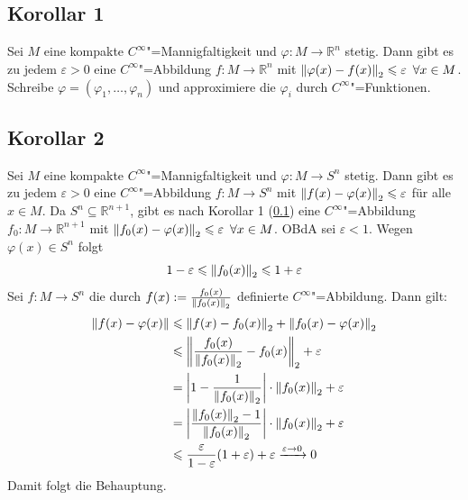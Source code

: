 \subsection[Korollar 1: Approximation von $\varphi : M \to \mathds{R}^n$ stetig durch $C^\infty$"=Funktionen]{Korollar 1} %
\label{sub:172}
Sei $M$ eine kompakte $C^\infty$"=Mannigfaltigkeit und $\varphi : M \to \mathds{R}^n$ stetig. Dann gibt es zu jedem $\varepsilon >0$ eine $C^\infty$"=Abbildung 
$f : M \to \mathds{R}^n$ mit $\norm[2]{\varphi(x)- f(x)}  \le \varepsilon \enspace \forall x \in M$. 
Schreibe $\varphi= (\varphi_1, \ldots , \varphi_n)$ und approximiere die $\varphi_i$ durch $C^\infty$"=Funktionen. \bewende

\subsection[Korollar 2: $\varphi : M \to S^n$ lässt sich approximieren durch $C^\infty$"=Funktion $f: M \to S^n$]{Korollar 2} %
\label{sub:173}
Sei $M$ eine kompakte $C^\infty$"=Mannigfaltigkeit und $\varphi : M \to S^n$ stetig. Dann gibt es zu jedem $\varepsilon >0$ eine $C^\infty$"=Abbildung $f : M \to S^n$ mit
$\norm[2]{f(x)- \varphi(x)} \le \varepsilon$ für alle $x \in M$.
Da $S^n \subseteq \mathds{R}^{n+1}$, gibt es nach Korollar 1 (\ref{sub:172}) eine $C^\infty$"=Abbildung $f_0 : M \to \mathds{R}^{n+1}$ mit $\norm[2]{f_0(x)-\varphi(x)}\le 
\varepsilon \enspace \forall x \in M$. OBdA sei $\varepsilon <1$. Wegen $\varphi(x) \in S^n$ folgt
\[
	1 - \varepsilon \le \norm[2]{f_0(x)} \le 1+ \varepsilon 
\]
Sei $f : M \to S^n$ die durch $f(x) := \frac{f_0(x)}{\norm[2]{f_0(x)} } $ definierte $C^\infty$"=Abbildung. Dann gilt: 
\begin{align*}
	\norm{f(x)- \varphi(x)} &\le \norm[2]{f(x)- f_0(x)} + \norm[2]{f_0(x)- \varphi(x)}   \\
	&\le \norm[2]{\frac{f_0(x)}{\norm[2]{f_0(x)} } - f_0(x)} + \varepsilon \\
	&= \abs*{1- \frac{1}{\norm[2]{f_0(x)} } } \cdot \norm[2]{f_0(x)} + \varepsilon \\
	&= \abs*{\frac{\norm[2]{f_0(x)}-1 }{\norm[2]{f_0(x)} } } \cdot \norm[2]{f_0(x)} + \varepsilon \\
	&\le \frac{\varepsilon}{1 - \varepsilon} (1+ \varepsilon) + \varepsilon \xrightarrow{\varepsilon \to 0} 0
\end{align*}
Damit folgt die Behauptung. \bewende

